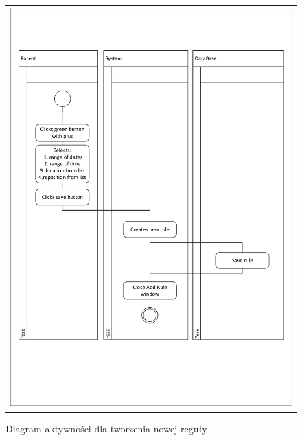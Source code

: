 \documentclass{sprawozdanie-agh}
\begin{document}
			\begin{figure}[H]
				\centering
				\begin{tabular}{c}
					\includegraphics[width=.95\textwidth]{crudCreate_cropped} 
				\end{tabular}
			\caption{Diagram aktywności dla tworzenia nowej reguły}
			\end{figure}
\end{document}
